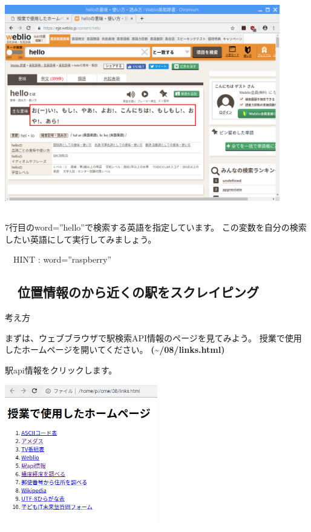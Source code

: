 \begin{center}
\includegraphics[width=0.9\textwidth]{./text08-img/textbook-img046.png}

\end{center}
\subsection*{\theQuestion\label{Q:weblio}}
7行目のword=”hello”で検索する英語を指定しています。
この変数を自分の検索したい英語にして実行してみましょう。

\ \ HINT : word=”raspberry”


\bigskip

\clearpage\subsection*{\theExercise　位置情報のから近くの駅をスクレイピング}
\addtocounter{Exercise}{-1}\label{E:station}
考え方

まずは、ウェブブラウザで駅検索API情報のページを見てみよう。
授業で使用したホームページを開いてください。
\textbf{({\textasciitilde}/08/links.html)}

駅api情報をクリックします。



\begin{center}
\includegraphics[width=0.5\textwidth]{./text08-img/textbook-img017.png}

\end{center}


